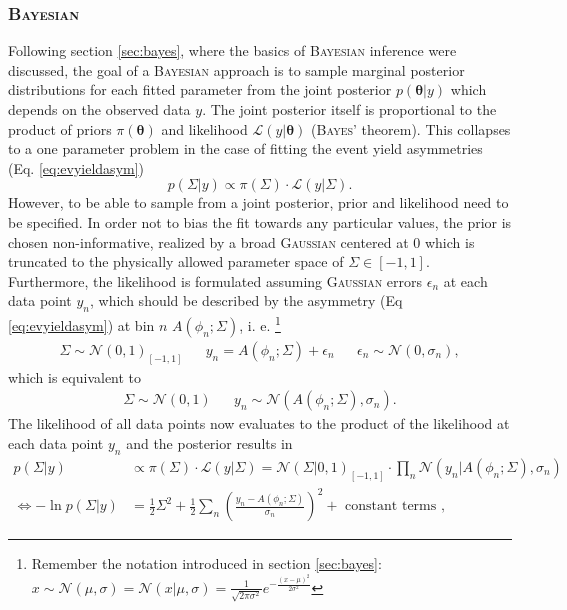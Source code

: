 \subsubsection{\textsc{Bayesian}}
Following section \ref{sec:bayes}, where the basics of \textsc{Bayesian} inference were discussed, the goal of a \textsc{Bayesian} approach is to sample marginal posterior distributions for each fitted parameter from the joint posterior $p(\boldsymbol{\theta}|y)$ which depends on the observed data $y$. The joint posterior itself is proportional to the product of priors $\pi(\boldsymbol{\theta})$ and likelihood $\mathcal{L}(y|\boldsymbol{\theta})$ (\textsc{Bayes'} theorem). This collapses to a one parameter problem in the case of fitting the event yield asymmetries (Eq. \eqref{eq:evyieldasym})
\begin{equation}
	p(\Sigma|y)\propto \pi({\Sigma})\cdot \mathcal{L}(y|\Sigma).
\end{equation}
However, to be able to sample from a joint posterior, prior and likelihood need to be specified. In order not to bias the fit towards any particular values, the prior is chosen non-informative, realized by a broad \textsc{Gaussian} centered at 0 which is truncated to the physically allowed parameter space of $\Sigma\in[-1,1]$. Furthermore, the likelihood is formulated assuming \textsc{Gaussian} errors $\epsilon_n$ at each data point $y_n$, which should be described by the asymmetry (Eq \eqref{eq:evyieldasym}) at bin $n$ $A(\phi_n;\Sigma)$, i. e. \footnote{Remember the notation introduced in section \ref{sec:bayes}: $x\sim\mathcal{N}(\mu,\sigma)=\mathcal{N}(x|\mu,\sigma)=\frac{1}{\sqrt{2\pi\sigma^2}}e^{-\frac{(x-\mu)^2}{2\sigma^2}}$}
\begin{align}
	\Sigma \sim \mathcal{N}\left(0,1\right)_{[-1,1]} && y_n=A\left(\phi_n;\Sigma\right)+\epsilon_n && \epsilon_n\sim\mathcal{N}\left(0,\sigma_n\right),
\end{align}
which is equivalent to
\begin{align}
	 \Sigma \sim \mathcal{N}(0,1) &&y_n\sim\mathcal{N}\left(A(\phi_n;\Sigma),\sigma_n\right).
\end{align}
The likelihood of all data points now evaluates to the product of the likelihood at each data point $y_n$ and the posterior results in \begin{align}
	p(\Sigma|y)&\propto\pi(\Sigma)\cdot\mathcal{L}(y|\Sigma)=\mathcal{N}\left(\Sigma|0,1\right)_{[-1,1]}\cdot\prod_{n}\mathcal{N}\left(y_n|A\left(\phi_n;\Sigma\right),\sigma_n\right)\\
	\Leftrightarrow -\ln p(\Sigma|y)&=\frac{1}{2}\Sigma^2+\frac{1}{2}\sum_{n}\left(\frac{y_n-A\left(\phi_n;\Sigma\right)}{\sigma_n}\right)^2+\text{ constant terms }, 
\end{align}
